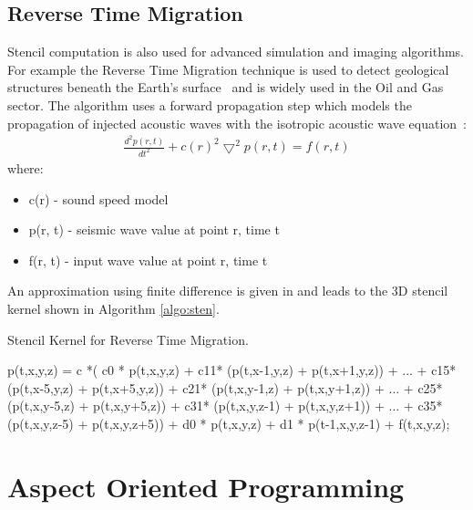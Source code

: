 \subsection{Reverse Time Migration}
\label{sec:rtm-back}
Stencil computation is also used for advanced simulation and imaging
algorithms. For example the Reverse Time Migration technique is used
to detect geological structures beneath the Earth's
surface~\cite{baysal1983reverse} and is widely used in the Oil and Gas
sector. The algorithm uses a forward propagation step which models the
propagation of injected acoustic waves with the isotropic acoustic
wave equation~\cite{araya2011assessing}:
\begin{align}
  \frac{d^2p(r,t)}{dt^2} + {c(r)}^2\bigtriangledown^2p(r,t) = f(r,t)
\end{align}
where:
\begin{itemize}
\item c(r)    - sound speed model
\item p(r, t) - seismic wave value at point r, time t
\item f(r, t) - input wave value at point r, time t
\end{itemize}

An approximation using finite difference is given in
\cite{xinyu2013selfaware} and leads to the 3D stencil kernel
\cite{Xinyu:Qiwei:Luk:Qiang:Pell:2012} shown in Algorithm
\ref{algo:sten}.
\begin{algorithm}[!ht]\footnotesize
  \caption{Stencil Kernel for Reverse Time Migration.}
  \label{algo:sten}
  \begin{algorithmic}
    \State p(t,x,y,z) = c *(
    \State c0 * p(t,x,y,z) +
    \State c11* (p(t,x-1,y,z) + p(t,x+1,y,z)) + ... + c15*(p(t,x-5,y,z) + p(t,x+5,y,z)) +
    \State c21* (p(t,x,y-1,z) + p(t,x,y+1,z)) + ... + c25*(p(t,x,y-5,z) + p(t,x,y+5,z)) +
    \State c31* (p(t,x,y,z-1) + p(t,x,y,z+1)) + ... + c35*(p(t,x,y,z-5) + p(t,x,y,z+5)) +
    \State d0 *  p(t,x,y,z) + d1 * p(t-1,x,y,z-1) + f(t,x,y,z);
    \EndFor
    \EndFor
    \EndFor
    \EndFor
  \end{algorithmic}
\end{algorithm}


\section{Aspect Oriented Programming}


